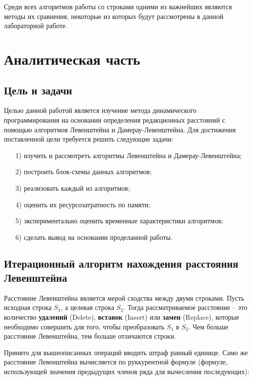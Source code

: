 \documentclass[12pt]{report}
\begin{document}
Среди всех алгоритмов работы со строками одними из важнейших являются методы их сравнения, некоторые из которых будут рассмотрены в данной лабораторной работе.

	
	\chapter{Аналитическая часть}
	
	\section{Цель и задачи}
	
	Целью данной работой является изучение метода динамического программирования на основании определения редакционных расстояний с помощью алгоритмов Левенштейна и Дамерау-Левенштейна. Для достижения поставленной цели требуется решить следующие задачи:
	
	\begin{enumerate}
		\item[1)] изучить и рассмотреть алгоритмы Левенштейна и Дамерау-Левенштейна;
		\item[2)] построить блок-схемы данных алгоритмов;
		\item[3)] реализовать каждый из алгоритмов;
		\item[4)] оценить их ресурсозатратность по памяти;
		\item[5)] экспериментально оценить временные характеристики алгоритмов;
		\item[6)] сделать вывод на основании проделанной работы.
	\end{enumerate}
	
	
	\section{Итерационный алгоритм нахождения расстояния Левенштейна}
	
	Расстояние Левенштейна является мерой сходства между двумя строками. Пусть исходная строка $S_{1}$, а целевая строка $S_{2}$. Тогда рассматриваемое расстояние -- это количество \textbf{удалений} (Delete), \textbf{вставок} (Insert) или \textbf{замен} (Replace), которые необходимо совершить для того, чтобы преобразовать $S_{1}$ в $S_{2}$. Чем больше расстояние Левенштейна, тем больше отличаются строки.
	
	Принято для вышеописанных операций вводить штраф равный единице. Само же расстояние Левенштейна вычисляется по руккурентной формуле (формуле, использующей значения предыдущих членов ряда для вычесления последующих):
	
\end{document}
